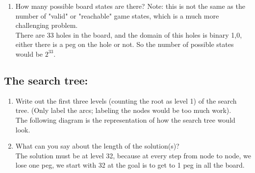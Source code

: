 \documentclass{article}
\def\ans#1{{\color{ans}#1}}
\newcommand{\centerfig}[2]{\begin{center}\texttt{[image: \#2]}\end{center}}
\begin{document}
\begin{enumerate}[label=(\alph*)]
{        the peg that is moving to the column $i'$ and row $j'$, e.g., an arc with the label 
        31.33 will represent that a peg in row 3 column 1 will be moved to row 3 column 3.
    }
    \item How many possible board states are there? Note: this is not the same as the number of "valid" or "reachable" game states, which is a much more challenging problem.\\
    \ans{
        There are 33 holes in the board, and the domain of this holes is binary {1,0}, 
        either there is a peg on the hole or not. So the number of possible states would 
        be $2^{33}$.
    }
\end{enumerate}

\subsection{The search tree:}
\begin{enumerate}[label=(\alph*)]
    \item Write out the first three levels (counting the root as level 1) of the search tree. (Only label the arcs; labeling the nodes would be too much work). \\
    \ans{
        The following diagram is the representation of how the search tree would look.
    }
    \item What can you say about the length of the solution(s)? \\
    \ans{
        The solution must be at level 32, because at every step from node to node, we 
        lose one peg, we start with 32 at the goal is to get to 1 peg in all the board.
    }

\end{enumerate}
\end{document}
